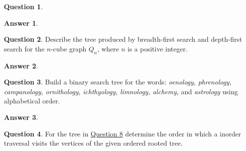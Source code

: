 \documentclass[article, 12pt]{article}
\theoremstyle{definition}
\newtheorem{question}{Question}
\newtheorem{answer}{Answer}
\begin{document}
\begin{question}
\begin{figure}[H]
        \end{figure}
    \end{question}

    \begin{answer}
        \label{a6}
    \end{answer}

    \begin{question}
        \label{q7}
        Describe the tree produced by breadth-first search and depth-first search for the $n$-cube graph $Q_n$, where $n$ is a positive integer.
    \end{question}

    \begin{answer}
        \label{a7}
    \end{answer}

    \begin{question}
        \label{q8}
        Build a binary search tree for the words: {\em oenology, phrenology, campanology, ornithology, ichthyology, limnology, alchemy,} and {\em astrology} using alphabetical order.   
     \end{question}

    \begin{answer}
        \label{a8}
    \end{answer}

    \begin{question}
        \label{q9}
        For the tree in \hyperref[a8]{Question 8} determine the order in which a inorder traversal visits the vertices of the given ordered rooted tree.    
    \end{question}
\end{document}
